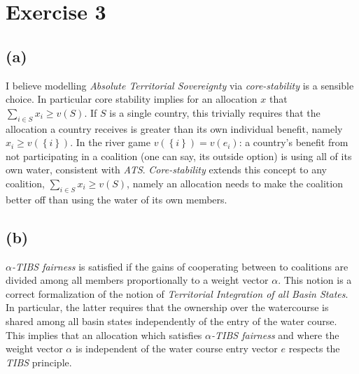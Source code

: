 \documentclass[american]{scrartcl}
\newcommand{\set}[1]{\left\{#1\right\}}
\begin{document}
\section*{Exercise 3}

\subsection*{(a)}

I believe modelling \textit{Absolute Territorial Sovereignty} via \textit{core-stability} is a sensible choice. In particular core stability implies for an allocation $x$ that $\sum_{i \in S} x_i \geq v(S)$. If $S$ is a single country, this trivially requires that the allocation a country receives is greater than its own individual benefit, namely $x_i \geq v(\set{i})$. In the river game $v(\set{i}) = v(e_i)$: a country's benefit from not participating in a coalition (one can say, its outside option) is using all of its own water, consistent with \textit{ATS}. \textit{Core-stability} extends this concept to any coalition, $\sum_{i \in S} x_i \geq v(S)$, namely an allocation needs to make the coalition better off than using the water of its own members.

\subsection*{(b)}

$\alpha$\textit{-TIBS fairness} is satisfied if the gains of cooperating between to coalitions are divided among all members proportionally to a weight vector $\alpha$. This notion is a correct formalization of the notion of \textit{Territorial Integration of all Basin States}. In particular, the latter requires that the ownership over the watercourse is shared among all basin states independently of the entry of the water course. This implies that an allocation which satisfies $\alpha$\textit{-TIBS fairness} and where the weight vector $\alpha$ is independent of the water course entry vector $e$ respects the \textit{TIBS} principle.
\end{document}
